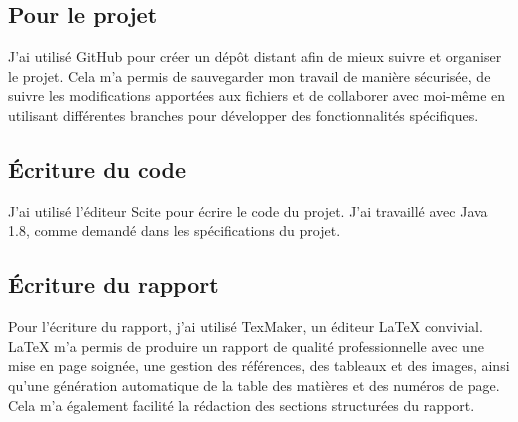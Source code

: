 \subsection{Pour le projet}

J'ai utilisé GitHub pour créer un dépôt distant afin de mieux suivre et organiser le projet. Cela m'a permis de sauvegarder mon travail de manière sécurisée, de suivre les modifications apportées aux fichiers et de collaborer avec moi-même en utilisant différentes branches pour développer des fonctionnalités spécifiques.

\subsection{Écriture du code}

J'ai utilisé l'éditeur Scite pour écrire le code du projet. J'ai travaillé avec Java 1.8, comme demandé dans les spécifications du projet.

\subsection{Écriture du rapport}

Pour l'écriture du rapport, j'ai utilisé TexMaker, un éditeur LaTeX convivial. LaTeX m'a permis de produire un rapport de qualité professionnelle avec une mise en page soignée, une gestion des références, des tableaux et des images, ainsi qu'une génération automatique de la table des matières et des numéros de page. Cela m'a également facilité la rédaction des sections structurées du rapport.
